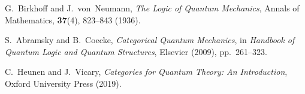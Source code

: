 \documentclass[12pt]{article}
\begin{document}
\vspace{1em}

\begin{thebibliography}{9}

G.~Birkhoff and J.~von~Neumann, 
\emph{The Logic of Quantum Mechanics}, 
Annals of Mathematics, \textbf{37}(4), 823--843 (1936).

S.~Abramsky and B.~Coecke, 
\emph{Categorical Quantum Mechanics}, 
in \emph{Handbook of Quantum Logic and Quantum Structures}, 
Elsevier (2009), pp.~261--323.

C.~Heunen and J.~Vicary,
\emph{Categories for Quantum Theory: An Introduction},
Oxford University Press (2019).

\end{thebibliography}
\end{document}

